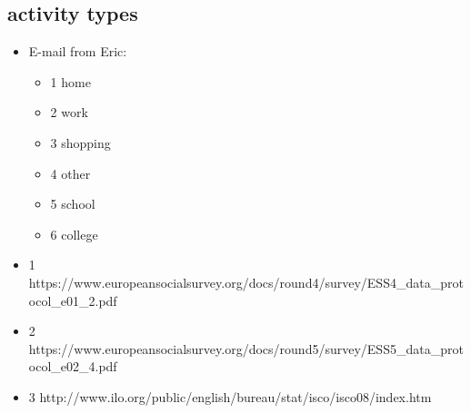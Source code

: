\documentclass[12pt]{article}
\begin{document}
\subsection{activity types}
\begin{itemize}
\item E-mail from Eric:
\begin{itemize}
\item 1 home
\item 2 work
\item 3 shopping
\item 4 other
\item 5 school
\item 6 college
\end{itemize}
\end{itemize}

\begin{itemize}
\item
1 https://www.europeansocialsurvey.org/docs/round4/survey/ESS4\_data\_protocol\_e01\_2.pdf
\item
2 https://www.europeansocialsurvey.org/docs/round5/survey/ESS5\_data\_protocol\_e02\_4.pdf
\item
3 http://www.ilo.org/public/english/bureau/stat/isco/isco08/index.htm
\end{itemize}
\end{document}
